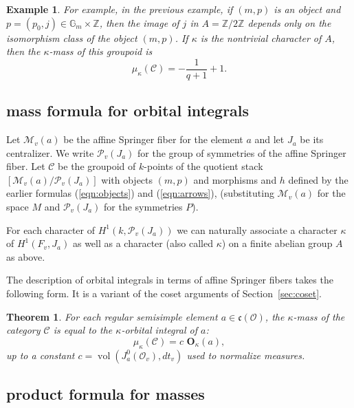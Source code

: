\documentclass[brochure,english,12pt]{bourbaki}
\newtheorem{example}[equation]{Example}
\newtheorem{theorem}[equation]{Theorem}
\def\op#1{{\operatorname{#1}}}
\newcommand{\ring}[1]{\mathbb{#1}}
\def\OO{{\mathbf O}}
\def\cc{\mathfrak{c}}
\def\C{{\mathcal C}}
\def\M{{\mathcal M}}
\def\P{{\mathcal P}}
\def\O{{\mathcal O}}
\begin{document}
\begin{example}
  For example, in the previous example, if $(m,p)$ is an object and
  $p=(p_0,j)\in \ring{G}_m\times\ring{Z}$, then the image of $j$ in
  $A=\ring{Z}/2\ring{Z}$ depends only on the isomorphism class of the
  object $(m,p)$.  If $\kappa$ is the nontrivial character of $A$,
  then the $\kappa$-mass of this groupoid is
\[
\mu_\kappa(\C) = -\frac{1}{q+1} + 1.
\]
\end{example}



\subsection{mass formula for orbital integrals}


Let $\M_v(a)$ be the affine Springer fiber for the element $a$ and let
$J_a$ be its centralizer.  We write $\P_v(J_a)$ for the group of
symmetries of the affine Springer fiber.   Let $\C$ be the groupoid of $k$-points of
the quotient stack $[\M_v(a)/\P_v(J_a)]$ with objects $(m,p)$ and morphisms
and $h$ defined by the earlier formulas (\ref{eqn:objects}) and (\ref{eqn:arrows}),
(substituting $\M_v(a)$ for the space $M$ and $\P_v(J_a)$ for the symmetries $P$).

For each character of $H^1(k,\P_v(J_a))$ we can naturally associate a
character $\kappa$ of $H^1(F_v,J_a)$ as well as a character (also
called $\kappa$) on a finite abelian group $A$ as above.

The description of orbital integrals in terms of affine Springer fibers
 takes the following form.  It is a variant of the coset arguments of Section~\ref{sec:coset}.


\begin{theorem}\label{lemma:orbital-mass}
For each regular semisimple element $a\in \cc(\O)$, 
the $\kappa$-mass of the category $\C$ is equal to the
$\kappa$-orbital integral of $a$:
\[
\mu_\kappa(\C) = c\,\, \OO_\kappa(a),
\]
up to a constant $c=\op{vol}(J^0_a(\O_v),dt_v)$ used to normalize measures.
\end{theorem}






\subsection{product formula for masses} 
\end{document}
